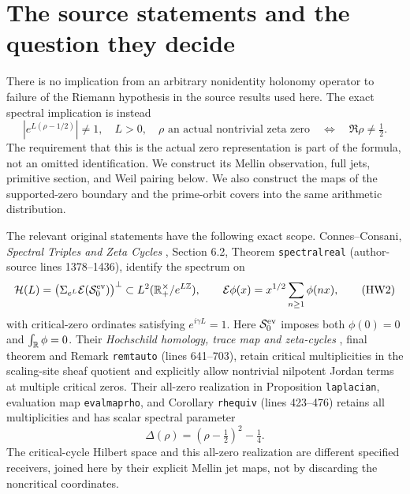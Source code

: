 \section{The source statements and the question they decide}

There is no implication from an arbitrary nonidentity holonomy
operator to failure of the Riemann hypothesis in the source results
used here. The exact spectral implication is instead
\[
 \left|e^{L(\rho-1/2)}\right|\ne1,\quad L>0,\quad
 \rho\text{ an actual nontrivial zeta zero}
 \quad\Longleftrightarrow\quad \Re\rho\ne\tfrac12.
 \tag{HW1}\label{hw:criterion}
\]
The requirement that this is the actual zero representation is
part of the formula, not an omitted identification. We construct its
Mellin observation, full jets, primitive section, and Weil pairing
below. We also construct the maps of the supported-zero boundary and
the prime-orbit covers into the same arithmetic distribution.

The relevant original statements have the following exact scope.
Connes--Consani, \emph{Spectral Triples and Zeta Cycles}
\cite{HW-CCcycles}, Section 6.2, Theorem \texttt{spectralreal}
(author-source lines 1378--1436), identify the spectrum on
\[
 \mathcal H(L)=
 \bigl(\Sigma_{e^L}\mathcal E(\mathcal S^{\rm ev}_0)\bigr)^\perp
 \subset L^2(\mathbb R_+^\times/e^{L\mathbb Z}),\qquad
 \mathcal E\phi(x)=x^{1/2}\sum_{n\ge1}\phi(nx),
 \tag{HW2}
\]
with critical-zero ordinates satisfying \(e^{i\gamma L}=1\).
Here \(\mathcal S^{\rm ev}_0\) imposes both
\(\phi(0)=0\) and \(\int_\mathbb R\phi=0\).
Their \emph{Hochschild homology, trace map and zeta-cycles}
\cite{HW-CCHH}, final theorem and Remark \texttt{remtauto}
(lines 641--703), retain critical multiplicities in the
scaling-site sheaf quotient and explicitly allow nontrivial
nilpotent Jordan terms at multiple critical zeros.
Their all-zero realization in Proposition \texttt{laplacian},
evaluation map \texttt{evalmaprho}, and Corollary
\texttt{rhequiv} (lines 423--476) retains all multiplicities and
has scalar spectral parameter
\[
 \Delta(\rho)=(\rho-\tfrac12)^2-\tfrac14.
 \tag{HW3}
\]
The critical-cycle Hilbert space and this all-zero realization are
different specified receivers, joined here by their explicit Mellin
jet maps, not by discarding the noncritical coordinates.

